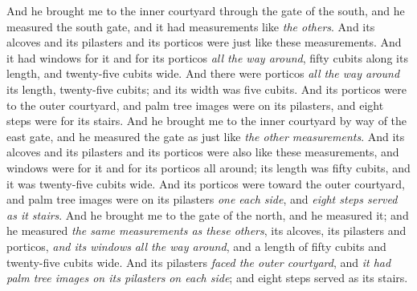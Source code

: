 \begin{biblechapter}
 And he brought me to the inner courtyard through the gate of the south, and he measured the south gate, and it had measurements like \textit{the others}.
\verse And its alcoves and its pilasters and its porticos were just like these measurements. And it had windows for it and for its porticos \textit{all the way around}, fifty cubits along its length, and twenty-five cubits wide.
\verse And there were porticos \textit{all the way around} its length, twenty-five cubits; and its width was five cubits.
\verse And its porticos were to the outer courtyard, and palm tree images were on its pilasters, and eight steps were for its stairs.
\verse And he brought me to the inner courtyard by way of the east gate, and he measured the gate as just like \textit{the other measurements}.
\verse And its alcoves and its pilasters and its porticos were also like these measurements, and windows were for it and for its porticos all around; its length was fifty cubits, and it was twenty-five cubits wide.
\verse And its porticos were toward the outer courtyard, and palm tree images were on its pilasters \textit{one each side}, and \textit{eight steps served as it stairs}.
\verse And he brought me to the gate of the north, and he measured it; and he measured \textit{the same measurements as these others},
\verse its alcoves, its pilasters and porticos, \textit{and its windows} \textit{all the way around}, and a length of fifty cubits and twenty-five cubits wide.
\verse And its pilasters \textit{faced the outer courtyard}, and \textit{it had palm tree images on its pilasters} \textit{on each side}; and eight steps served as its stairs.

\end{biblechapter}
